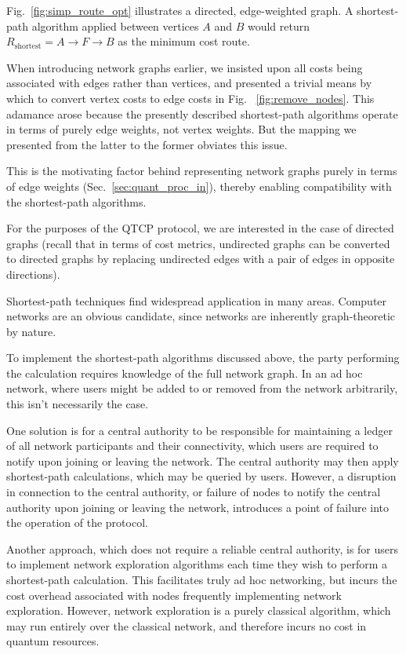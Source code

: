 \documentclass[aps,rmp,twocolumn,amsmath,amssymb,nofootinbib,superscriptaddress]{revtex4}
\begin{document}
Fig.~\ref{fig:simp_route_opt} illustrates a directed, edge-weighted graph. A shortest-path algorithm applied between vertices $A$ and $B$ would return \mbox{$R_\mathrm{shortest} = A\to F\to B$} as the minimum cost route.

When introducing network graphs earlier, we insisted upon all costs being associated with edges rather than vertices, and presented a trivial means by which to convert vertex costs to edge costs in Fig.~ \ref{fig:remove_nodes}. This adamance arose because the presently described shortest-path algorithms operate in terms of purely edge weights, not vertex weights. But the mapping we presented from the latter to the former obviates this issue.

This is the motivating factor behind representing network graphs purely in terms of edge weights (Sec.~\ref{sec:quant_proc_in}), thereby enabling compatibility with the shortest-path algorithms.

For the purposes of the QTCP protocol, we are interested in the case of directed graphs (recall that in terms of cost metrics, undirected graphs can be converted to directed graphs by replacing undirected edges with a pair of edges in opposite directions).

Shortest-path techniques find widespread application in many areas. Computer networks are an obvious candidate, since networks are inherently graph-theoretic by nature.

To implement the shortest-path algorithms discussed above, the party performing the calculation requires knowledge of the full network graph. In an ad hoc network, where users might be added to or removed from the network arbitrarily, this isn't necessarily the case.

One solution is for a central authority to be responsible for maintaining a ledger of all network participants and their connectivity, which users are required to notify upon joining or leaving the network. The central authority may then apply shortest-path calculations, which may be queried by users. However, a disruption in connection to the central authority, or failure of nodes to notify the central authority upon joining or leaving the network, introduces a point of failure into the operation of the protocol.

Another approach, which does not require a reliable central authority, is for users to implement network exploration algorithms each time they wish to perform a shortest-path calculation. This facilitates truly ad hoc networking, but incurs the cost overhead associated with nodes frequently implementing network exploration. However, network exploration is a purely classical algorithm, which may run entirely over the classical network, and therefore incurs no cost in quantum resources.
\end{document}
